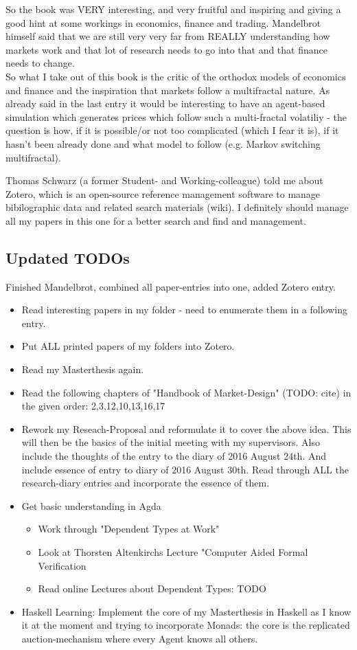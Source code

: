\bigskip

So the book was VERY interesting, and very fruitful and inspiring and giving a good hint at some workings in economics, finance and trading. Mandelbrot himself said that we are still very very far from REALLY understanding how markets work and that lot of research needs to go into that and that finance needs to change. \\
So what I take out of this book is the critic of the orthodox models of economics and finance and the inspiration that markets follow a multifractal nature. As already said in the last entry it would be interesting to have an agent-based simulation which generates prices which follow such a multi-fractal volatiliy - the question is how, if it is possible/or not too complicated (which I fear it is), if it hasn't been already done and what model to follow (e.g. Markov switching multifractal).

\bigskip

Thomas Schwarz (a former Student- and Working-colleague) told me about Zotero, which is an open-source reference management software to manage bibilographic data and related search materials (wiki). I definitely should manage all my papers in this one for a better search and find and management.

\subsection*{Updated TODOs}
Finished Mandelbrot, combined all paper-entries into one, added Zotero entry.

\begin{itemize}
\item Read interesting papers in my folder - need to enumerate them in a following entry.
\item Put ALL printed papers of my folders into Zotero. 
\item Read my Masterthesis again.
\item Read the following chapters of "Handbook of Market-Design" (TODO: cite) in the given order: 2,3,12,10,13,16,17
\item Rework my Reseach-Proposal and reformulate it to cover the above idea. 
This will then be the basics of the initial meeting with my supervisors. Also include the thoughts of the entry to the diary of 2016 August 24th. And include essence of entry to diary of 2016 August 30th. Read through ALL the research-diary entries and incorporate the essence of them.
\item Get basic understanding in Agda 
	\begin{itemize}
	\item Work through "Dependent Types at Work"
	\item Look at Thorsten Altenkirchs Lecture "Computer Aided Formal Verification
	\item Read online Lectures about Dependent Types: TODO
	\end{itemize}
\item Haskell Learning: Implement the core of my Masterthesis in Haskell as I know it at the moment and trying to incorporate Monads: the core is the replicated auction-mechanism where every Agent knows all others.
\end{itemize}